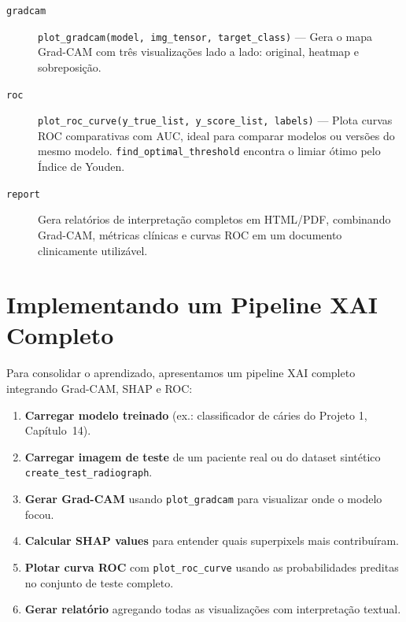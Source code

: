 \begin{description}
  \item[\texttt{gradcam}] \texttt{plot\_gradcam(model, img\_tensor, target\_class)}
    — Gera o mapa Grad-CAM com três visualizações lado a lado: original,
    heatmap e sobreposição.

  \item[\texttt{roc}] \texttt{plot\_roc\_curve(y\_true\_list, y\_score\_list, labels)}
    — Plota curvas ROC comparativas com AUC, ideal para comparar modelos
    ou versões do mesmo modelo. \texttt{find\_optimal\_threshold} encontra
    o limiar ótimo pelo Índice de Youden.

  \item[\texttt{report}] Gera relatórios de interpretação completos em
    HTML/PDF, combinando Grad-CAM, métricas clínicas e curvas ROC em um
    documento clinicamente utilizável.
\end{description}

\section{Implementando um Pipeline XAI Completo}

Para consolidar o aprendizado, apresentamos um pipeline XAI completo
integrando Grad-CAM, SHAP e ROC:

\begin{enumerate}
  \item \textbf{Carregar modelo treinado} (ex.: classificador de cáries
    do Projeto 1, Capítulo~14).

  \item \textbf{Carregar imagem de teste} de um paciente real ou do
    dataset sintético \texttt{create\_test\_radiograph}.

  \item \textbf{Gerar Grad-CAM} usando \texttt{plot\_gradcam} para
    visualizar onde o modelo focou.

  \item \textbf{Calcular SHAP values} para entender quais superpixels
    mais contribuíram.

  \item \textbf{Plotar curva ROC} com \texttt{plot\_roc\_curve} usando
    as probabilidades preditas no conjunto de teste completo.

  \item \textbf{Gerar relatório} agregando todas as visualizações com
    interpretação textual.
\end{enumerate}

